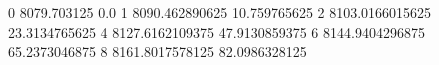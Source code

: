 0 8079.703125 0.0
1 8090.462890625 10.759765625
2 8103.0166015625 23.3134765625
4 8127.6162109375 47.9130859375
6 8144.9404296875 65.2373046875
8 8161.8017578125 82.0986328125
